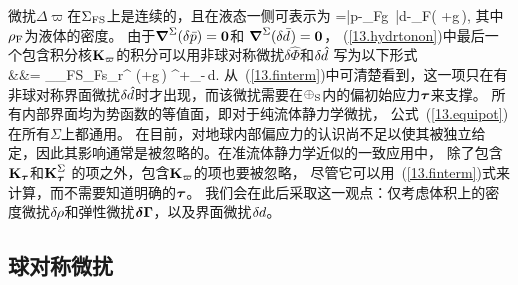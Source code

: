 微扰$\Delta\varpi$在$\Sigma_{\rm FS}$上是连续的，且在液态一侧可表示为
\eq
\Delta\varpi=\delta\bar{p}-\rho_{\rm F}g\,
\delta\hspace{-0.1 mm}\bar{d}-\rho_{\rm F}(\delta\hat{\Phi}
+g\,\delta\hspace{-0.1 mm}\hspace{0.2 mm}),
\en
其中$\rho_{\rm F}$为液体的密度。
由于$\mbox{\boldmath $\nabla$}^{\Sigma}(\delta\bar{p})=\mbox{${\bf 0}$}$和
$\mbox{\boldmath $\nabla$}^{\Sigma}(\delta\hspace{-0.1 mm}\bar{d}\hspace{0.2 mm})=\mbox{${\bf 0}$}$，
(\ref{13.hydrtonon})中最后一个包含积分核$\mbox{${\bf K}$}_{\varpi}$的积分可以用非球对称微扰$\delta\hat{\Phi}$和$\delta\hspace{-0.1 mm}\hat{d}$
写为以下形式
\eqa
\label{13.finterm}
 \nonumber \\
&&\mbox{}=
\int_{\Sigma_{\rm FS}}\rho_{\rm F}s_r\bdel^{\Sigma}
(\delta\hat{\Phi}+g\,\delta\hspace{-0.1 mm}\hspace{0.2 mm})
\cdot[\bs]^+_-\,d\Sigma.
\ena
从~(\ref{13.finterm})中可清楚看到，这一项只在有非球对称界面微扰$\delta\hspace{-0.1 mm}\hat{d}$时才出现，而该微扰需要在$\earth_{\rm S}$内的偏初始应力$\mbox{\boldmath $\bf \tau$}$来支撑。
所有内部界面均为势函数的等值面，即对于纯流体静力学微扰，
公式~(\ref{13.equipot})在所有$\Sigma$上都通用。
在目前，对地球内部偏应力的认识尚不足以使其被独立给定，因此其影响通常是被忽略的。在准流体静力学近似的一致应用中，
%
除了包含$\mbox{${\bf K}$}_{\mbox{\boldmath $\scriptstyle{\tau}$}}$和$\mbox{${\bf K}$}_{\mbox{\boldmath $\scriptstyle{\tau}$}}^{\Sigma}$
的项之外，包含$\mbox{${\bf K}$}_{\varpi}$的项也要被忽略，
尽管它可以用~(\ref{13.finterm})式来计算，而不需要知道明确的$\mbox{\boldmath $\bf \tau$}$。
我们会在此后采取这一观点：仅考虑体积上的密度微扰$\delta\hspace{-0.2 mm}\rho$和弹性微扰$\mbox{\boldmath $\bf \delta$}\mbox{\boldmath $\bf \Gamma$}$，以及界面微扰$\delta\hspace{-0.1 mm}d$。
%
%

\renewcommand{\thesubsection}{$\!\!\!\raise1.3ex\hbox{$\star$}\!\!$
\arabic{chapter}.\arabic{section}.\arabic{subsection}}
\subsection{球对称微扰}
%
%
\renewcommand{\thesubsection}{\arabic{chapter}.\arabic{section}.\arabic{subsection}}

